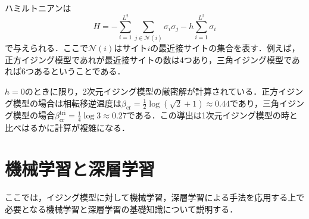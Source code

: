\documentclass[a4paper,11pt]{jsreport}
\begin{document}
ハミルトニアンは
\begin{equation}
  H = - \sum_{i=1}^{L^2} \sum_{j \in \mathcal{N}(i)} \sigma_i \sigma_j
  - h \sum_{i=1}^{L^2} \sigma_i
\end{equation}
で与えられる．ここで$\mathcal{N}(i)$はサイト$i$の最近接サイトの集合を表す．例えば，正方イジング模型であれが最近接サイトの数は4つあり，三角イジング模型であれば6つあるということである．\par
$h=0$のときに限り，2次元イジング模型の厳密解が計算されている．正方イジング模型の場合は相転移逆温度は$\beta_{\text{cr}} = \frac{1}{2}\log{(\sqrt{2}+1)} \approx 0.44$であり，三角イジング模型の場合$\beta_{\text{cr}}^{\text{tri}} = \frac{1}{4}\log{3} \approx 0.27$である．この導出は1次元イジング模型の時と比べはるかに計算が複雑になる．



\chapter{機械学習と深層学習}
ここでは，イジング模型に対して機械学習，深層学習による手法を応用する上で必要となる機械学習と深層学習の基礎知識について説明する．\cite{瀧2017これなら}\cite{富谷2021これなら}\cite{田中2019ディープ}\cite{福嶋2022基礎からの}
\end{document}
